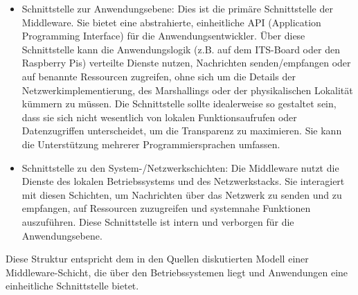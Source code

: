 \begin{itemize}
	\item{Schnittstelle zur Anwendungsebene:} Dies ist die primäre Schnittstelle der Middleware. Sie bietet eine abstrahierte, einheitliche API (Application Programming Interface) für die Anwendungsentwickler. Über diese Schnittstelle kann die Anwendungslogik (z.B. auf dem ITS-Board oder den Raspberry Pis) verteilte Dienste nutzen, Nachrichten senden/empfangen oder auf benannte Ressourcen zugreifen, ohne sich um die Details der Netzwerkimplementierung, des Marshallings oder der physikalischen Lokalität kümmern zu müssen. Die Schnittstelle sollte idealerweise so gestaltet sein, dass sie sich nicht wesentlich von lokalen Funktionsaufrufen oder Datenzugriffen unterscheidet, um die Transparenz zu maximieren. Sie kann die Unterstützung mehrerer Programmiersprachen umfassen.
	
	\item{Schnittstelle zu den System-/Netzwerkschichten:} Die Middleware nutzt die Dienste des lokalen Betriebssystems und des Netzwerkstacks. Sie interagiert mit diesen Schichten, um Nachrichten über das Netzwerk zu senden und zu empfangen, auf Ressourcen zuzugreifen und systemnahe Funktionen auszuführen. Diese Schnittstelle ist intern und verborgen für die Anwendungsebene.
	
	
	
	
\end{itemize}



Diese Struktur entspricht dem in den Quellen diskutierten Modell einer Middleware-Schicht, die über den Betriebssystemen liegt und Anwendungen eine einheitliche Schnittstelle bietet.